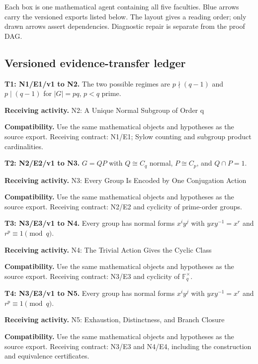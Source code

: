 \documentclass[preprint,12pt,aps,pra,showkeys,amsmath,amssymb,superscriptaddress,floatfix]{revtex4-2}
\theoremstyle{definition}
\theoremstyle{remark}
\newcommand{\field}[2]{\par\smallskip\noindent\textbf{#1.} #2\par}
\begin{document}
Each box is one mathematical agent containing all five faculties. Blue
arrows carry the versioned exports listed below. The layout gives a
reading order; only drawn arrows assert dependencies. Diagnostic repair
is separate from the proof DAG.

\clearpage\subsection{Versioned evidence-transfer ledger}

\begingroup\small\linespread{1.05}\selectfont

\field{T1: N1/E1/v1 to N2}{The two possible regimes are \(p\nmid(q-1)\) and \(p\mid(q-1)\) for
\(|G|=pq\), \(p<q\) prime.}

\field{Receiving activity}{N2: A Unique Normal Subgroup of Order q}

\field{Compatibility}{Use the same mathematical objects and hypotheses as the source export.
Receiving contract: N1/E1; Sylow counting and subgroup product
cardinalities.}

\field{T2: N2/E2/v1 to N3}{\(G=QP\) with \(Q\cong C_q\) normal, \(P\cong C_p\), and \(Q\cap P=1\).}

\field{Receiving activity}{N3: Every Group Is Encoded by One Conjugation Action}

\field{Compatibility}{Use the same mathematical objects and hypotheses as the source export.
Receiving contract: N2/E2 and cyclicity of prime-order groups.}

\field{T3: N3/E3/v1 to N4}{Every group has normal forms \(x^iy^j\) with \(yxy^{-1}=x^r\) and
\(r^p\equiv1\pmod q\).}

\field{Receiving activity}{N4: The Trivial Action Gives the Cyclic Class}

\field{Compatibility}{Use the same mathematical objects and hypotheses as the source export.
Receiving contract: N3/E3 and cyclicity of \(\mathbb F_q^\times\).}

\field{T4: N3/E3/v1 to N5}{Every group has normal forms \(x^iy^j\) with \(yxy^{-1}=x^r\) and
\(r^p\equiv1\pmod q\).}

\field{Receiving activity}{N5: Exhaustion, Distinctness, and Branch Closure}

\field{Compatibility}{Use the same mathematical objects and hypotheses as the source export.
Receiving contract: N3/E3 and N4/E4, including the construction and
equivalence certificates.}
\end{document}
